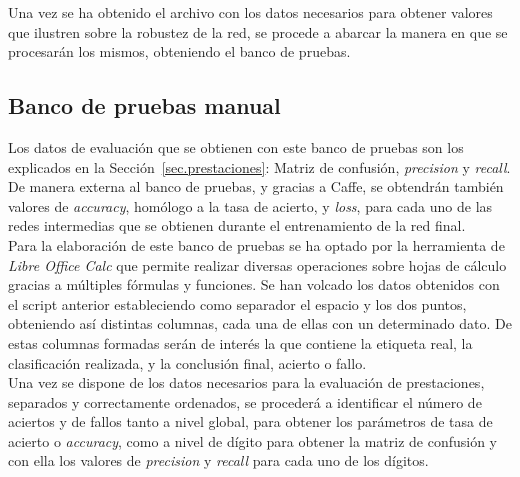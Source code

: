 Una vez se ha obtenido el archivo con los datos necesarios para obtener valores que ilustren sobre la robustez de la red, se procede a abarcar la manera en que se procesarán los mismos, obteniendo el banco de pruebas.

\subsection{Banco de pruebas manual}
Los datos de evaluación que se obtienen con este banco de pruebas son los explicados en la Sección~\ref{sec.prestaciones}: Matriz de confusión, \textit{precision} y \textit{recall}. De manera externa al banco de pruebas, y gracias a Caffe, se obtendrán también valores de \textit{accuracy}, homólogo a la tasa de acierto, y \textit{loss}, para cada uno de las redes intermedias que se obtienen durante el entrenamiento de la red final.\\

Para la elaboración de este banco de pruebas se ha optado por la herramienta de \textit{Libre Office Calc} que permite realizar diversas operaciones sobre hojas de cálculo gracias a múltiples fórmulas y funciones. Se han volcado los datos obtenidos con el script anterior estableciendo como separador el espacio y los dos puntos, obteniendo así distintas columnas, cada una de ellas con un determinado dato. De estas columnas formadas serán de interés la que contiene la etiqueta real, la clasificación realizada, y la conclusión final, acierto o fallo.\\

Una vez se dispone de los datos necesarios para la evaluación de prestaciones, separados y correctamente ordenados, se procederá a identificar el número de aciertos y de fallos tanto a nivel global, para obtener los parámetros de tasa de acierto o \textit{accuracy}, como a nivel de dígito para obtener la matriz de confusión y con ella los valores de \textit{precision} y \textit{recall} para cada uno de los dígitos.

